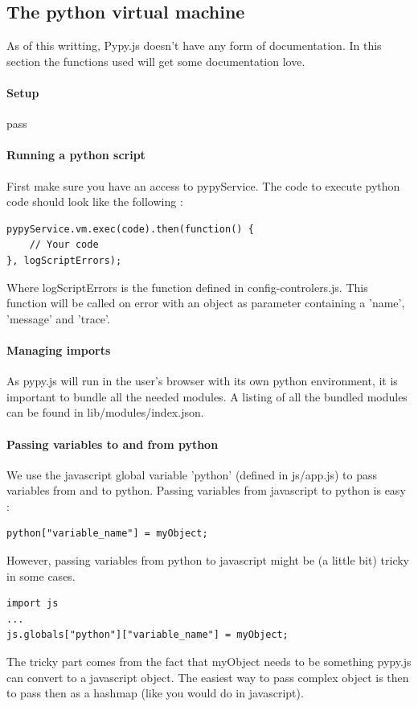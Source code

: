 \documentclass[10pt,a4paper]{article}
\begin{document}
\subsection{The python virtual machine}
As of this writting, Pypy.js doesn't have any form of documentation. In this section the functions used will get some documentation love. 
\paragraph{Setup}
pass
\paragraph{Running a python script}
First make sure you have an access to pypyService. The code to execute python code should look like the following : 
\lstset{language=python}
\begin{lstlisting}
pypyService.vm.exec(code).then(function() {
	// Your code
}, logScriptErrors);
\end{lstlisting}
Where logScriptErrors is the function defined in config-controlers.js. This function will be called on error with an object as parameter containing a 'name', 'message' and 'trace'.

\paragraph{Managing imports}
As pypy.js will run in the user's browser with its own python environment, it is important to bundle all the needed modules.
A listing of all the bundled modules can be found in lib/modules/index.json.

\paragraph{Passing variables to and from python}
We use the javascript global variable 'python' (defined in js/app.js) to pass variables from and to python. 
Passing variables from javascript to python is easy : 
\lstset{language=python}
\begin{lstlisting}
python["variable_name"] = myObject;
\end{lstlisting}
However, passing variables from python to javascript might be (a little bit) tricky in some cases.
\lstset{language=python}
\begin{lstlisting}
import js
...
js.globals["python"]["variable_name"] = myObject;
\end{lstlisting}
The tricky part comes from the fact that myObject needs to be something pypy.js can convert to a javascript object. The easiest way to pass complex object is then to pass then as a hashmap (like you would do in javascript).
\end{document}
